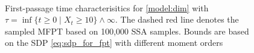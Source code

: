 \begin{figure}
	\myfloatalign
	 \\
	\caption[\ac{FPT} and \ac{MFPT} distribution and bounds]{First-passage time characterisitics for \autoref{model:dim} with $\tau=\inf\{t\geq 0\mid X_t \geq 10\}\land \infty$.
	The dashed red line denotes the sampled \ac{MFPT} based on 100,000 \ac{SSA} samples. Bounds are based on the \ac{SDP} \eqref{eq:sdp_for_fpt} with different moment orders}
\end{figure}

